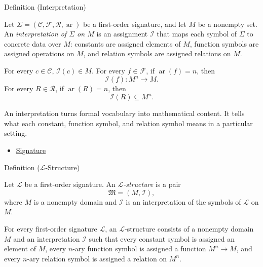\begin{definitionbox}{Definition (Interpretation)}
\begin{definition}[Interpretation]
\label{def:axiom-systems-interpretation}
Let $\Sigma=(\mathcal{C},\mathcal{F},\mathcal{R},\operatorname{ar})$ be a
first-order signature, and let $M$ be a nonempty set. An
\emph{interpretation of $\Sigma$ on $M$} is an assignment $\mathcal{I}$ that
maps each symbol of $\Sigma$ to concrete data over $M$: constants are assigned
elements of $M$, function symbols are assigned operations on $M$, and relation
symbols are assigned relations on $M$.
\end{definition}
\end{definitionbox}

\begin{remark*}
For every $c\in\mathcal{C}$, $\mathcal{I}(c)\in M$. For every
$f\in\mathcal{F}$, if $\operatorname{ar}(f)=n$, then
\[
  \mathcal{I}(f):M^n\to M.
\]
For every $R\in\mathcal{R}$, if $\operatorname{ar}(R)=n$, then
\[
  \mathcal{I}(R)\subseteq M^n.
\]
\end{remark*}

\begin{remark*}[Interpretation]
An interpretation turns formal vocabulary into mathematical content. It tells
what each constant, function symbol, and relation symbol means in a particular
setting.
\end{remark*}

\begin{dependencies}
\begin{itemize}
  \item \hyperref[def:signature]{Signature}
\end{itemize}
\end{dependencies}

\begin{definitionbox}{Definition ($\mathcal{L}$-Structure)}
\begin{definition}
\label{def:axiom-systems-structure}
Let $\mathcal{L}$ be a first-order signature. An
\emph{$\mathcal{L}$-structure} is a pair
\[
  \mathfrak{M}=(M,\mathcal{I}),
\]
where $M$ is a nonempty domain and $\mathcal{I}$ is an interpretation of the
symbols of $\mathcal{L}$ on $M$.
\end{definition}
\end{definitionbox}

\begin{remark*}
For every first-order signature $\mathcal{L}$, an $\mathcal{L}$-structure
consists of a nonempty domain $M$ and an interpretation $\mathcal{I}$ such
that every constant symbol is assigned an element of $M$, every $n$-ary
function symbol is assigned a function $M^n\to M$, and every $n$-ary relation
symbol is assigned a relation on $M^n$.
\end{remark*}


